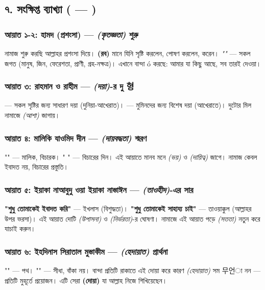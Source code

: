 \subsection*{৭. সংক্ষিপ্ত ব্যাখ্যা ( —    )}

\subsubsection*{\textbf{আয়াত ১-২: হামদ (প্রশংসা) — \textit{ (কৃতজ্ঞতা)} শুরু}}
নামাজ শুরু করছি আল্লাহর প্রশংসা দিয়ে। \textbf{ (রব)} মানে যিনি সৃষ্টি করলেন, পোষণ করলেন,  করেন। \textit{""} — সকল জগত (মানুষ, জিন, ফেরেশতা, প্রাণী, গ্রহ-নক্ষত্র)। এখানে বান্দা ó করছে: আমার যা কিছু আছে, সব তারই দেওয়া।

\subsubsection*{\textbf{আয়াত ৩: রাহমান ও রাহীম — \textit{ (দয়া)}-র দু 형}}
\textbf{} — সকল সৃষ্টির জন্য সাধারণ দয়া (দুনিয়া-আখেরাত)। \textbf{} — মুমিনদের জন্য বিশেষ দয়া (আখেরাতে)। দুটোর মিল নামাজে \textit{ (আশা)} জাগায়।

\subsubsection*{\textbf{আয়াত ৪: মালিকি যাওমিদ দীন — \textit{ (দায়বদ্ধতা)} স্মরণ}}
"" — মালিক, বিচারক। " " — বিচারের দিন। এই আয়াতে মানব মনে \textit{ (ভয়)} ও \textit{ (দায়িত্ব)} জাগে। নামাজ কেবল ইবাদত নয়, বিচারের প্রস্তুতি।

\subsubsection*{\textbf{আয়াত ৫: ইয়াকা নাআবুদু ওয়া ইয়াকা নাস্তাঈন — \textit{ (তাওহীদ)}-এর সার}}
\textbf{"শুধু তোমাকেই ইবাদত করি"} — ইখলাস (বিশুদ্ধতা)। \textbf{"শুধু তোমাকেই সাহায্য চাই"} — তাওয়াক্কুল (আল্লাহর উপর ভরসা)। এই আয়াত দোটি \textit{ (উপাসনা)} ও \textit{ (নির্ভরতা)}-র ঘোষণা। নামাজে এই আয়াত পড়ে \textit{ (সততা)} নতুন করে যাচাই করুন।

\subsubsection*{\textbf{আয়াত ৬: ইহদিনাস সিরাতাল মুস্তাকীম — \textit{ (হেদায়াত)} প্রার্থনা}}
"" — পথ। "" — সীধা, বাঁকা নয়। বান্দা প্রতিটি রাকাতে এই দোয়া করে কারণ \textit{ (হেদায়াত)} সম 무언া নন — প্রতিটি মুহূর্তে প্রয়োজন। এটি সেরা \textbf{ (দোয়া)} যা আল্লাহ নিজে শিখিয়েছেন।

